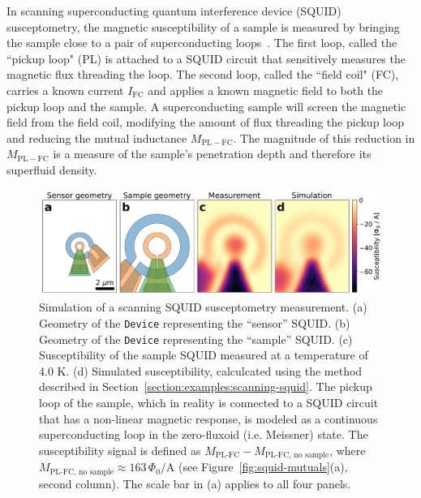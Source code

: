 \documentclass[final,3p,times,twocolumn]{elsarticle}
\newcommand{\inline}[1]{\texttt{#1}\xspace}
\begin{document}
In scanning superconducting quantum interference device (SQUID) susceptometry, the magnetic susceptibility of a sample is measured by bringing the sample close to a pair of superconducting loops~\cite{Gardner2001-gr, Huber2008-il, Kirtley_Kalisky_2012}. The first loop, called the ``pickup loop" (PL) is attached to a SQUID circuit that sensitively measures the magnetic flux threading the loop. The second loop, called the ``field coil" (FC), carries a known current $I_\mathrm{FC}$ and applies a known magnetic field to both the pickup loop and the sample. A superconducting sample will screen the magnetic field from the field coil, modifying the amount of flux threading the pickup loop and reducing the mutual inductance $M_\mathrm{PL-FC}$. The magnitude of this reduction in $M_\mathrm{PL-FC}$ is a measure of the sample's penetration depth and therefore its superfluid density.

\begin{figure}
    \centering
    \includegraphics[width=\textwidth]{examples/images/squid-susc-simulation.pdf}
    \caption{Simulation of a scanning SQUID susceptometry measurement. (a) Geometry of the \inline{Device} representing the ``sensor'' SQUID. (b) Geometry of the \inline{Device} representing the ``sample'' SQUID. (c) Susceptibility of the sample SQUID measured at a temperature of 4.0 K. (d) Simulated susceptibility, calculcated using the method described in Section~\ref{section:examples:scanning-squid}. The pickup loop of the sample, which in reality is connected to a SQUID circuit that has a non-linear magnetic response, is modeled as a continuous superconducting loop in the zero-fluxoid (i.e. Meissner) state. The susceptibility signal is defined as $M_\text{PL-FC} - M_\text{PL-FC, no sample}$, where $M_\text{PL-FC, no sample}\approx163\,\Phi_0/\mathrm{A}$ (see Figure~\ref{fig:squid-mutuals}(a), second column). The scale bar in (a) applies to all four panels.}
    \label{fig:squid-susc}
\end{figure}
\end{document}
